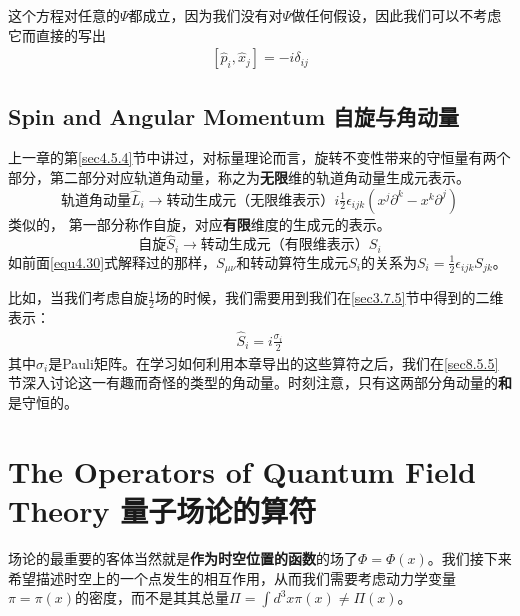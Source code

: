 这个方程对任意的$\Psi$都成立，因为我们没有对$\Psi$做任何假设，因此我们可以不考虑它而直接的写出
\begin{align}\label{equ5.3}
[\hat{p}_i,\hat{x}_j] = -i\delta_{ij}
\end{align}

\subsection[自旋与角动量]{Spin and Angular Momentum 自旋与角动量}\label{sec5.1.1}

上一章的第\ref{sec4.5.4}节中讲过，对标量理论而言，旋转不变性带来的守恒量有两个部分，第二部分对应轨道角动量，称之为{\bfseries 无限}维的轨道角动量生成元表示。
\[\text{轨道角动量}\hat{L}_i\to\text{转动生成元（无限维表示）}i\tfrac{1}{2}\epsilon_{ijk}(x^j\partial^k-x^k\partial^j)\]
类似的， 第一部分称作自旋，对应{\bfseries 有限}维度的生成元的表示。
\[\text{自旋}\hat{S}_i\to\text{转动生成元（有限维表示）}S_i \]
如前面\eqref{equ4.30}式解释过的那样，$S_{\mu\nu}$和转动算符生成元$S_i$的关系为$S_i = \tfrac{1}{2}\epsilon_{ijk}S_{jk}$。

比如，当我们考虑自旋$\tfrac{1}{2}$场的时候，我们需要用到我们在\ref{sec3.7.5}节中得到的二维表示：
\begin{align}\label{equ5.4}
\hat{S}_i = i\frac{\sigma_i}{2}
\end{align}
其中$\sigma_i$是Pauli矩阵。在学习如何利用本章导出的这些算符之后，我们在\ref{sec8.5.5}节深入讨论这一有趣而奇怪的类型的角动量。时刻注意，只有这两部分角动量的{\bfseries 和}是守恒的。

\section[量子场论的算符]{The Operators of Quantum Field Theory 量子场论的算符}\label{sec5.2}

场论的最重要的客体当然就是{\bfseries 作为时空位置的函数}的场了$\Phi = \Phi(x)$。我们接下来希望描述时空上的一个点发生的相互作用，从而我们需要考虑动力学变量$\pi = \pi(x)$的密度，而不是其其总量$\Pi = \int d^3x\pi(x)\neq\Pi(x)$。

